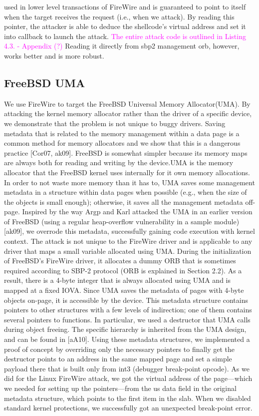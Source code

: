 used in lower level transactions of FireWire and is guaranteed to point to itself when the target receives the request (i.e., when we attack). By reading this pointer, the attacker is able to deduce the shellcode’s virtual address and set it into callback to launch the attack. \textcolor{magenta}{The entire attack code is outlined in Listing 4.3. - Appendix (?) } Reading it directly from sbp2 management orb, however, works better and is more robust.
\subsection{FreeBSD UMA}
We use FireWire to target the FreeBSD Universal Memory Allocator(UMA). By attacking the kernel memory allocator rather than the driver of a specific device, we demonstrate that the problem is not unique to buggy drivers. Saving metadata that is related to the memory management within a data page is a common method for memory allocators and we show that this is a dangerous practice [Cor07, ak09]. FreeBSD is somewhat simpler because its memory maps are always both for reading and writing by the device.UMA is the memory allocator that the FreeBSD kernel uses internally for it own memory allocations. In order to not waste more memory than it has to, UMA saves some management metadata in a structure within data pages when possible (e.g., when the size of the objects is small enough); otherwise, it saves all the management metadata off-page. Inspired by the way Argp and Karl attacked the UMA in an earlier version of FreeBSD (using a regular heap-overflow vulnerability in a sample module) [ak09], we overrode this metadata, successfully gaining code execution with kernel context. The attack is not unique to the FireWire driver and is applicable to any driver that maps a small variable allocated using UMA. During the initialization of FreeBSD’s FireWire driver, it allocates a dummy ORB that is sometimes required according to SBP-2 protocol (ORB is explained in Section 2.2). As a result, there is a 4-byte integer that is always allocated using UMA and is mapped at a fixed IOVA. Since UMA saves the metadata of pages with 4-byte objects on-page, it is accessible by the device. This metadata structure contains pointers to other structures with a few levels of indirection; one of them contains several pointers to functions. In particular, we used a destructor that UMA calls during object freeing. The specific hierarchy is inherited from the UMA design, and can be found in [aA10]. Using these metadata structures, we implemented a proof of concept by overriding only the necessary pointers to finally get the destructor points to an address in the same mapped page and set a simple payload there that is built only from int3 (debugger break-point opcode). As we did for the Linux FireWire attack, we got the virtual address of the page—which we needed for setting up the pointers—from the us data field in the original metadata structure, which points to the first item in the slab. When we disabled standard kernel protections, we successfully got an unexpected break-point error.